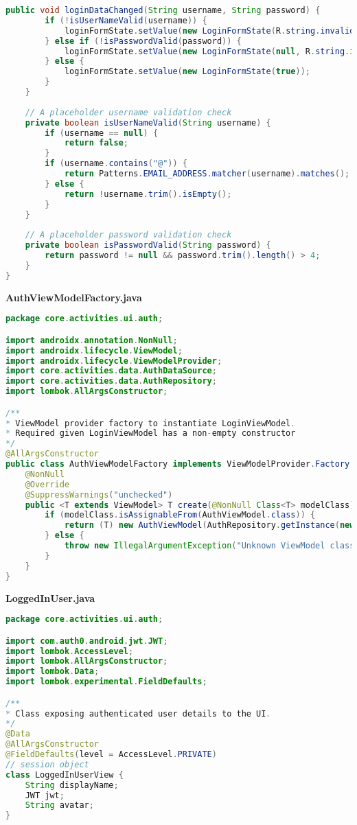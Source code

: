 \begin{lstlisting}[language=Java]
	public void loginDataChanged(String username, String password) {
		if (!isUserNameValid(username)) {
			loginFormState.setValue(new LoginFormState(R.string.invalid_username, null));
		} else if (!isPasswordValid(password)) {
			loginFormState.setValue(new LoginFormState(null, R.string.invalid_password));
		} else {
			loginFormState.setValue(new LoginFormState(true));
		}
	}
	
	// A placeholder username validation check
	private boolean isUserNameValid(String username) {
		if (username == null) {
			return false;
		}
		if (username.contains("@")) {
			return Patterns.EMAIL_ADDRESS.matcher(username).matches();
		} else {
			return !username.trim().isEmpty();
		}
	}
	
	// A placeholder password validation check
	private boolean isPasswordValid(String password) {
		return password != null && password.trim().length() > 4;
	}
}		
\end{lstlisting}

\textbf{AuthViewModelFactory.java}
\begin{lstlisting}[language=Java]
package core.activities.ui.auth;

import androidx.annotation.NonNull;
import androidx.lifecycle.ViewModel;
import androidx.lifecycle.ViewModelProvider;
import core.activities.data.AuthDataSource;
import core.activities.data.AuthRepository;
import lombok.AllArgsConstructor;

/**
* ViewModel provider factory to instantiate LoginViewModel.
* Required given LoginViewModel has a non-empty constructor
*/
@AllArgsConstructor
public class AuthViewModelFactory implements ViewModelProvider.Factory {
	@NonNull
	@Override
	@SuppressWarnings("unchecked")
	public <T extends ViewModel> T create(@NonNull Class<T> modelClass) {
		if (modelClass.isAssignableFrom(AuthViewModel.class)) {
			return (T) new AuthViewModel(AuthRepository.getInstance(new AuthDataSource()));
		} else {
			throw new IllegalArgumentException("Unknown ViewModel class");
		}
	}
}	
\end{lstlisting}

\textbf{LoggedInUser.java}
\begin{lstlisting}[language=Java]
package core.activities.ui.auth;

import com.auth0.android.jwt.JWT;
import lombok.AccessLevel;
import lombok.AllArgsConstructor;
import lombok.Data;
import lombok.experimental.FieldDefaults;

/**
* Class exposing authenticated user details to the UI.
*/
@Data
@AllArgsConstructor
@FieldDefaults(level = AccessLevel.PRIVATE)
// session object
class LoggedInUserView {
	String displayName;
	JWT jwt;
	String avatar;
}	
\end{lstlisting}

